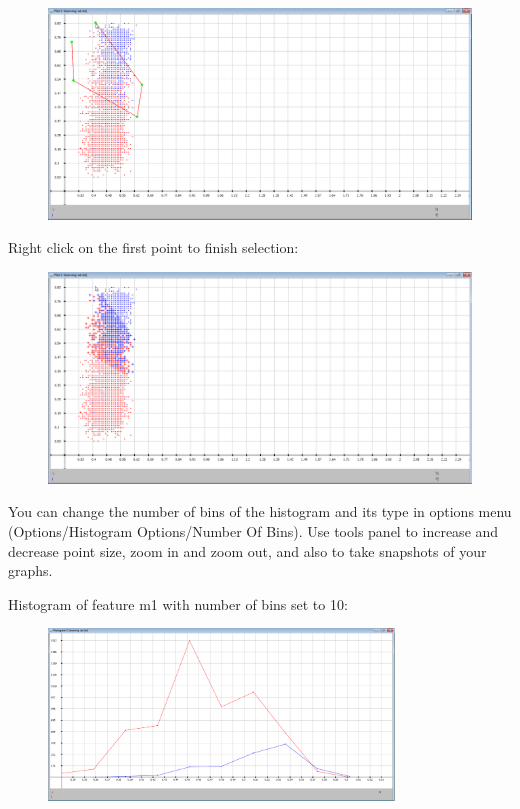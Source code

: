 \documentclass[a4paper,12pt,english]{report}
\begin{document}
\begin{figure}[htb]
\centering
\includegraphics[width=320pt]{s4.png}
\end{figure}

Right click on the first point to finish selection:

\begin{figure}[htb]
\centering
\includegraphics[width=320pt]{s5.png}
\end{figure}
 


\newpage
You can change the number of bins of the histogram and its type in options menu (Options/Histogram Options/Number Of Bins). Use tools panel to increase and decrease point size, zoom in and zoom out, and also to take snapshots of your graphs.



Histogram of feature m1 with number of bins set to 10:
 
\begin{figure}[htb]
\centering
\includegraphics[width=260pt]{s6.png}
\end{figure} 
 
\end{document}
